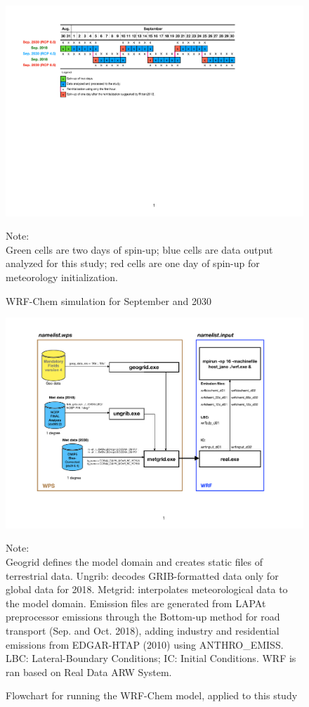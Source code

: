 \begin{figure}[htbp]
  \includegraphics[width=1\textwidth]{fig/WRFrun.pdf} %
  \caption{WRF-Chem simulation for September and 2030}
  {\scriptsize Note: \\ Green cells are two days of spin-up; blue cells are data output analyzed for this study; red cells are one day of spin-up for meteorology initialization.}
  \label{fig:run}
\end{figure}

	\begin{figure}[htbp]
		\begin{center}
			\includegraphics[width=1\textwidth]{fig/data_flow.pdf}
		\end{center}
		\caption{Flowchart for running the WRF-Chem model, applied to this study}
  		{\scriptsize Note: \\ Geogrid defines the model domain and creates static files of terrestrial data. Ungrib: decodes GRIB-formatted data only for global data for 2018. Metgrid: interpolates meteorological data to the model domain. Emission files are generated from LAPAt preprocessor emissions through the Bottom-up method for road transport (Sep. and Oct. 2018), adding industry and residential emissions from EDGAR-HTAP (2010) using ANTHRO\_EMISS.  LBC: Lateral-Boundary Conditions; IC: Initial Conditions. WRF is ran based on Real Data ARW System.}
  		\label{fig:flow}
	\end{figure}
	

